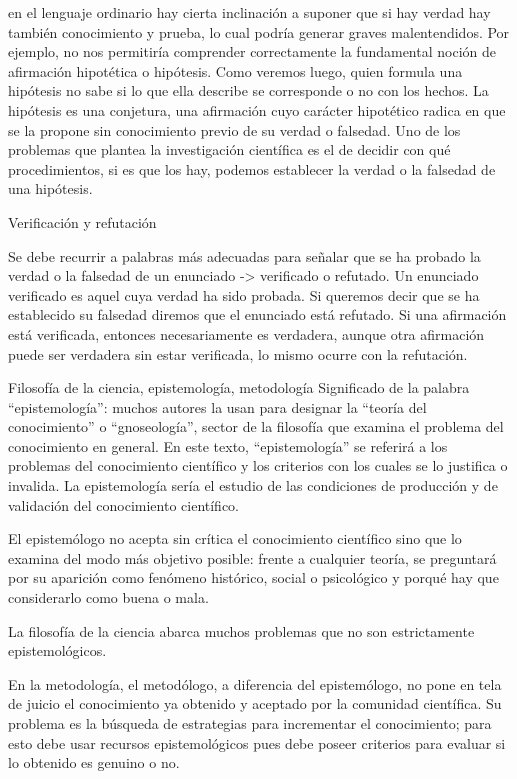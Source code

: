 \documentclass{article}
\begin{document}
en el lenguaje ordinario hay cierta inclinación a suponer que si hay verdad hay también conocimiento y prueba, lo cual podría generar graves malentendidos. Por ejemplo, no nos permitiría comprender correctamente la fundamental noción de afirmación hipotética o hipótesis. Como veremos luego, quien formula una hipótesis no sabe si lo que ella describe se corresponde o no con los hechos. La hipótesis es una conjetura, una afirmación cuyo carácter hipotético radica en que se la propone sin conocimiento previo de su verdad o falsedad. Uno de los problemas que plantea la investigación científica es el de decidir con qué procedimientos, si es que los hay, podemos establecer la verdad o la falsedad de una hipótesis.


Verificación y refutación

Se debe recurrir a palabras más adecuadas para señalar que se ha probado la verdad o la falsedad de un enunciado -> verificado o refutado. Un enunciado verificado es aquel cuya verdad ha sido probada. Si queremos decir que se ha establecido su falsedad diremos que el enunciado está refutado. Si una afirmación está verificada, entonces necesariamente es verdadera, aunque otra afirmación puede ser verdadera sin estar verificada, lo mismo ocurre con la refutación.

Filosofía de la ciencia, epistemología, metodología
Significado de la palabra “epistemología”: muchos autores la usan para designar la “teoría del conocimiento” o “gnoseología”, sector de la filosofía que examina el problema del conocimiento en general. En este texto, “epistemología” se referirá a los problemas del conocimiento científico y los criterios con los cuales se lo justifica o invalida. La epistemología sería el estudio de las condiciones de producción y de validación del conocimiento científico.

El epistemólogo no acepta sin crítica el conocimiento científico sino que lo examina del modo más objetivo posible: frente a cualquier teoría, se preguntará por su aparición como fenómeno histórico, social o psicológico y porqué hay que considerarlo como buena o mala.

La filosofía de la ciencia abarca muchos problemas que no son estrictamente epistemológicos.

En la metodología, el metodólogo, a diferencia del epistemólogo, no pone en tela de juicio el conocimiento ya obtenido y aceptado por la comunidad científica. Su problema es la búsqueda de estrategias para incrementar el conocimiento; para esto debe usar recursos epistemológicos pues debe poseer criterios para evaluar si lo obtenido es genuino o no.
\end{document}
